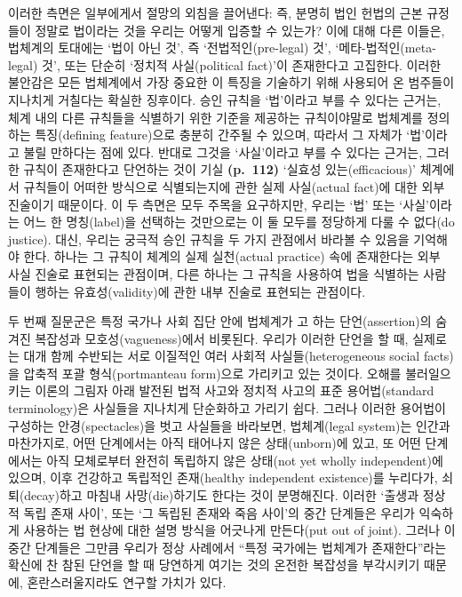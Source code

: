 이러한 측면은 일부에게서 절망의 외침을 끌어낸다: 즉, 분명히 법인 헌법의
근본 규정들이 정말로 법이라는 것을 우리는 어떻게 입증할 수 있는가? 이에
대해 다른 이들은, 법체계의 토대에는 ‘법이 아닌 것’, 즉
‘전법적인(pre-legal) 것’, ‘메타-법적인(meta-legal) 것’, 또는 단순히
‘정치적 사실(political fact)’이 존재한다고 고집한다. 이러한 불안감은
모든 법체계에서 가장 중요한 이 특징을 기술하기 위해 사용되어 온 범주들이
지나치게 거칠다는 확실한 징후이다. 승인 규칙을 ‘법’이라고 부를 수 있다는
근거는, 체계 내의 다른 규칙들을 식별하기 위한 기준을 제공하는
규칙이야말로 법체계를 정의하는 특징(defining feature)으로 충분히 간주될
수 있으며, 따라서 그 자체가 ‘법’이라고 불릴 만하다는 점에 있다. 반대로
그것을 ‘사실’이라고 부를 수 있다는 근거는, 그러한 규칙이 존재한다고
단언하는 것이 기실 \textbf{(p.~112)} ‘실효성 있는(efficacious)’ 체계에서
규칙들이 어떠한 방식으로 식별되는지에 관한 실제 사실(actual fact)에 대한
외부 진술이기 때문이다. 이 두 측면은 모두 주목을 요구하지만, 우리는 ‘법’
또는 ‘사실’이라는 어느 한 명칭(label)을 선택하는 것만으로는 이 둘 모두를
정당하게 다룰 수 없다(do justice). 대신, 우리는 궁극적 승인 규칙을 두
가지 관점에서 바라볼 수 있음을 기억해야 한다. 하나는 그 규칙이 체계의
실제 실천(actual practice) 속에 존재한다는 외부 사실 진술로 표현되는
관점이며, 다른 하나는 그 규칙을 사용하여 법을 식별하는 사람들이 행하는
유효성(validity)에 관한 내부 진술로 표현되는 관점이다.

두 번째 질문군은 특정 국가나 사회 집단 안에 법체계가
고 하는 단언(assertion)의 숨겨진 복잡성과
모호성(vagueness)에서 비롯된다. 우리가 이러한 단언을 할 때, 실제로는
대개 함께 수반되는 서로 이질적인 여러 사회적 사실들(heterogeneous social
facts)을 압축적 포괄 형식(portmanteau form)으로 가리키고 있는 것이다.
오해를 불러일으키는 이론의 그림자 아래 발전된 법적 사고와 정치적 사고의
표준 용어법(standard terminology)은 사실들을 지나치게 단순화하고 가리기
쉽다. 그러나 이러한 용어법이 구성하는 안경(spectacles)을 벗고 사실들을
바라보면, 법체계(legal system)는 인간과 마찬가지로, 어떤 단계에서는 아직
태어나지 않은 상태(unborn)에 있고, 또 어떤 단계에서는 아직 모체로부터
완전히 독립하지 않은 상태(not yet wholly independent)에 있으며, 이후
건강하고 독립적인 존재(healthy independent existence)를 누리다가,
쇠퇴(decay)하고 마침내 사망(die)하기도 한다는 것이 분명해진다. 이러한
‘출생과 정상적 독립 존재 사이’, 또는 ‘그 독립된 존재와 죽음 사이’의 중간
단계들은 우리가 익숙하게 사용하는 법 현상에 대한 설명 방식을 어긋나게
만든다(put out of joint). 그러나 이 중간 단계들은 그만큼 우리가 정상
사례에서 “특정 국가에는 법체계가 존재한다”라는 확신에 찬 참된 단언을
할 때 당연하게 여기는 것의 온전한 복잡성을 부각시키기 때문에,
혼란스러울지라도 연구할 가치가 있다.

